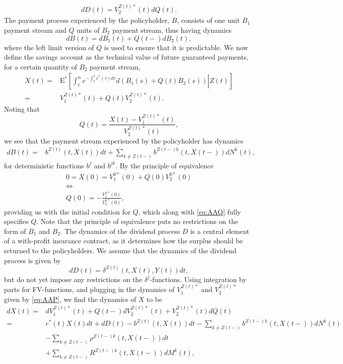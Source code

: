 \documentclass[12pt]{article}
\newcommand{\E}{\text{E}}
\theoremstyle{my_thm}
\begin{document}
\begin{align}
dD(t)=V_2^{Z(t)*}(t)dQ(t). \label{eq:AAQ}
\end{align}
The payment process experienced by the policyholder, $B$, consists of one unit $B_1$ payment stream and $Q$ units of $B_2$ payment stream, thus having dynamics
$$
dB(t)=dB_1(t)+ Q(t-)dB_2(t),
$$
where the left limit version of $Q$ is used to ensure that it is predictable. We now define the savings account as the technical value of future guaranteed payments, for a certain quantity of $B_2$ payment stream,
\begin{align*}
X(t)=&\E^*\left[ \left. \int_t^n e^{-\int_t^s r^*(\tau) d\tau} d\left( B_1(s) + Q(t) B_2(s) \right)  \right| Z(t) \right]
\\
=&
V_1^{Z(t)*}(t)+Q(t)V_2^{Z(t)*}(t). 
\end{align*}
Noting that
$$
Q(t)=\frac{X(t)-V_1^{Z(t)*}(t)}{V_2^{Z(t)*}(t)},
$$
we see that the payment stream experienced by the policyholder has dynamics
\begin{align*}
dB(t)%
=&b^{Z(t)}(t,X(t)) dt +\sum_{k \neq Z(t-)} b^{Z(t-)k}(t,X(t-))dN^k(t),
\end{align*}
for deterministic functions $b^j$ and $b^{jk}$. By the principle of equivalence
\begin{gather*}
0=X(0)=V_1^{0*}(0)+Q(0)V_2^{0*}(0)
\\
\Leftrightarrow
\\
Q(0)=-\frac{V_1^{0*}(0)}{V_2^{0*}(0)},
\end{gather*}
providing us with the initial condition for $Q$, which along with \eqref{eq:AAQ} fully specifies $Q$. Note that the principle of equivalence puts no restrictions on the form of $B_1$ and $B_2$. The dynamics of the dividend process $D$ is a central element of a with-profit insurance contract, as it determines how the surplus should be returned to the policyholders. We assume that the dynamics of the dividend process is given by
$$
dD(t)=\delta^{Z(t)}(t,X(t),Y(t)) dt,
$$
but do not yet impose any restrictions on the $\delta^j$-functions. Using integration by parts for FV-functions, and plugging in the dynamics of $V_1^{Z(t)*}$ and $V_2^{Z(t)*}$ given by \eqref{eq:AAP}, we find the dynamics of $X$ to be
\begin{align}
dX(t)=&
dV_1^{Z(t)*}(t)+Q(t-)dV_2^{Z(t)*}(t)+V_2^{Z(t)*}(t)dQ(t) \nonumber
\\
=&
r^*(t)X(t)dt
 +dD(t)
 -b^{Z(t)}(t,X(t)) dt
- \sum_{k \neq Z(t-)} b^{Z(t-)k}(t,X(t-)) dN^k(t)
\nonumber \\
&- \sum_{k \neq Z(t-)} \rho^{Z(t-)k}(t,X(t-))dt
\nonumber \\
&+ \sum_{k \neq Z(t-)}  R^{Z(t-)k}(t,X(t-))dM^k(t),\label{eq:AAB}
\end{align}
\end{document}
